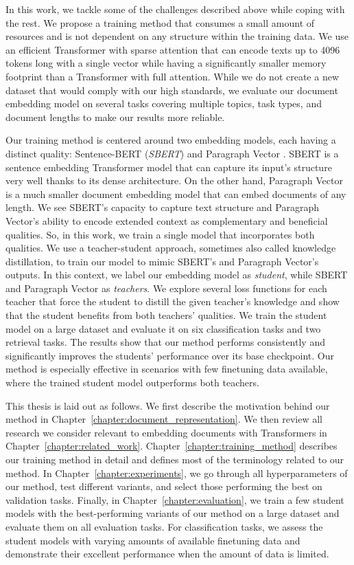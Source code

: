 In this work, we tackle some of the challenges described above while coping with the
rest. We propose a training method that consumes a small amount of resources
and is not dependent on any structure within the training data. We use an
efficient Transformer with sparse attention that can encode texts up to 4096
tokens long with a single vector while having a significantly smaller memory
footprint than a Transformer with full attention. While we do not create a new
dataset that would comply with our high standards, we evaluate our document
embedding model on several tasks covering multiple topics, task types, and
document lengths to make our results more reliable.

Our training method is centered around two embedding models, each having a
distinct quality: Sentence-BERT (\emph{SBERT}) \citep{reimers2019sentence} and
Paragraph Vector \citep{le2014distributed}. SBERT is a sentence embedding Transformer model that can capture its input's structure very well thanks to its dense
architecture. On the other hand, Paragraph Vector is a much smaller document embedding model that can embed documents of any length. We see SBERT's capacity to capture text structure and Paragraph Vector's ability to encode extended context as complementary and beneficial qualities. So, in this work, we train a single model that incorporates both qualities. We use a teacher-student approach, sometimes also called knowledge distillation, to train our model to mimic SBERT's and Paragraph Vector's outputs. In this context, we label our embedding model as \emph{student}, while SBERT and Paragraph Vector as \emph{teachers}. We explore several loss functions for each teacher that force the student to distill the given teacher's knowledge and show that the student benefits from both teachers' qualities. We train the student model on a large dataset and evaluate it on six classification tasks and two
retrieval tasks. The results show that our method performs consistently and
significantly improves the students' performance over its base checkpoint. Our
method is especially effective in scenarios with few finetuning data available,
where the trained student model outperforms both teachers.

This thesis is laid out as follows. We first describe the motivation behind our method in
Chapter~\ref{chapter:document_representation}. We then review all research we
consider relevant to embedding documents with Transformers in
Chapter~\ref{chapter:related_work}. Chapter~\ref{chapter:training_method}
describes our training method in detail and defines most of the terminology
related to our method. In Chapter~\ref{chapter:experiments}, we go through all
hyperparameters of our method, test different variants, and select those performing the best on validation tasks. Finally, in
Chapter~\ref{chapter:evaluation}, we train a few student models with the
best-performing variants of our method on a large dataset and evaluate them on
all evaluation tasks. For classification tasks, we assess the student models
with varying amounts of available finetuning data and demonstrate their
excellent performance when the amount of data is limited.
